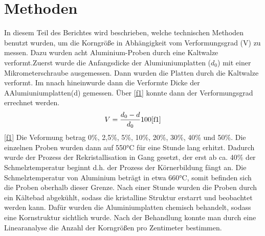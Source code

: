 \documentclass[
	a4paper,
	12pt,
	pagesize,
	ngerman
]{scrartcl}
\begin{document}
\section{Methoden}
In diesem Teil des Berichtes wird beschrieben, welche technischen Methoden benutzt wurden, um die Korngröße in Abhängigkeit vom Verformungsgrad (V) zu messen. Dazu wurden acht Aluminium-Proben durch eine Kaltwalze verformt.Zuerst wurde die Anfangsdicke der Alumiuniumplatten ($d_0$) mit einer Mikrometerschraube ausgemessen. Dann wurden die Platten durch die Kaltwalze verformt. Im nnach hineinwurde dann die Verformte Dicke der AAlumiuniumplatten(d) gemessen. Über \cref{f1} konnte dann der Verformungsgrad errechnet werden.
 \begin{align}
    V = \frac{d_0-d}{d_0}100 \cref{f1}
\end{align} \cref{f1}
Die Veformung betrag 0\%, 2,5\%, 5\%, 10\%, 20\%, 30\%, 40\% und 50\%.
Die einzelnen Proben wurden dann auf 550°C für eine Stunde lang erhitzt. Dadurch wurde der Prozess der Rekristallisation in Gang gesetzt, der erst ab ca. 40\% der Schmelztemperatur beginnt d.h. der Prozess der Körnerbildung fängt an. Die Schmelztemperatur von Aluminium beträgt in etwa 660°C, somit befinden sich die Proben oberhalb dieser Grenze. Nach einer Stunde wurden die Proben durch ein Kältebad abgekühlt, sodass die kristalline Struktur erstarrt und beobachtet werden kann. Dafür wurden die Aluminiumplatten chemisch behandelt, sodass eine Kornstruktur sichtlich wurde. Nach der Behandlung konnte man durch eine Linearanalyse die Anzahl der Korngrößen pro Zentimeter bestimmen.
\end{document}
